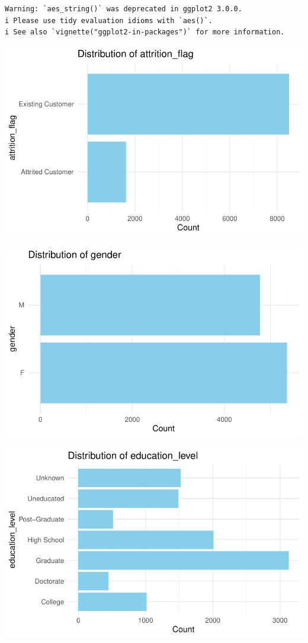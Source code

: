 \documentclass[
  letterpaper,
  DIV=11,
  numbers=noendperiod]{scrartcl}
\begin{document}
\begin{verbatim}
Warning: `aes_string()` was deprecated in ggplot2 3.0.0.
i Please use tidy evaluation idioms with `aes()`.
i See also `vignette("ggplot2-in-packages")` for more information.
\end{verbatim}

\includegraphics{Tackling-Attrition-at-Tifosi-Bank_files/figure-pdf/unnamed-chunk-8-1.pdf}

\includegraphics{Tackling-Attrition-at-Tifosi-Bank_files/figure-pdf/unnamed-chunk-8-2.pdf}

\includegraphics{Tackling-Attrition-at-Tifosi-Bank_files/figure-pdf/unnamed-chunk-8-3.pdf}
\end{document}
